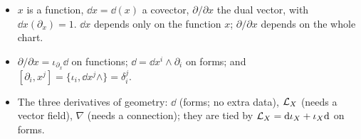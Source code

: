 \begin{keypoints}
\begin{itemize}
\item $x$ is a function, $\dd x=\dd(x)$ a covector, $\partial/\partial x$ the dual vector, with $\dd x(\partial_x)=1$. $\dd x$ depends only on the function $x$; $\partial/\partial x$ depends on the whole chart.
\item $\partial/\partial x=\iota_{\partial_x}\dd$ on functions; $\dd=\dd x^i\wedge\partial_i$ on forms; and $[\partial_i,x^j]=\{\iota_i,\dd x^j\wedge\}=\delta^j_i$.
\item The three derivatives of geometry: $\dd$ (forms; no extra data), $\mathcal{L}_X$ (needs a vector field), $\nabla$ (needs a connection); they are tied by $\mathcal{L}_X=\mathrm{d}\iota_X+\iota_X\mathrm{d}$ on forms.
\end{itemize}
\end{keypoints}
